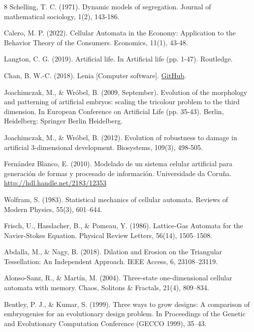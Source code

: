\documentclass[runningheads]{llncs}
\begin{document}
\begin{thebibliography}{8}
Schelling, T. C. (1971). Dynamic models of segregation. Journal of mathematical sociology, 1(2), 143-186. 

Calero, M. P. (2022). Cellular Automata in the Economy: Application to the Behavior Theory of the Consumers. Economics, 11(1), 43-48. 

Langton, C. G. (2019). Artificial life. In Artificial life (pp. 1-47). Routledge.

Chan, B. W.-C. (2018). Lenia [Computer software]. \href{https://github.com/Chakazul/Lenia}{GitHub}.

Joachimczak, M., \& Wróbel, B. (2009, September). Evolution of the morphology and patterning of artificial embryos: scaling the tricolour problem to the third dimension. In European Conference on Artificial Life (pp. 35-43). Berlin, Heidelberg: Springer Berlin Heidelberg. 

Joachimczak, M., \& Wróbel, B. (2012). Evolution of robustness to damage in artificial 3-dimensional development. Biosystems, 109(3), 498-505. 

Fernández Blanco, E. (2010). Modelado de un sistema celular artificial para generación de formas y procesado de información. Universidade da Coruña.
\url{http://hdl.handle.net/2183/12353}

Wolfram, S. (1983). Statistical mechanics of cellular automata. Reviews of Modern Physics, 55(3), 601–644.

Frisch, U., Hasslacher, B., \& Pomeau, Y. (1986). Lattice-Gas Automata for the Navier-Stokes Equation. Physical Review Letters, 56(14), 1505–1508.

Abdalla, M., \& Nagy, B. (2018). Dilation and Erosion on the Triangular Tessellation: An Independent Approach. IEEE Access, 6, 23108–23119.

Alonso-Sanz, R., \& Martín, M. (2004). Three-state one-dimensional cellular automata with memory. Chaos, Solitons \& Fractals, 21(4), 809–834.

Bentley, P. J., \& Kumar, S. (1999). Three ways to grow designs: A comparison of embryogenies for an evolutionary design problem. In Proceedings of the Genetic and Evolutionary Computation Conference (GECCO 1999), 35–43.


\end{thebibliography}
\end{document}
